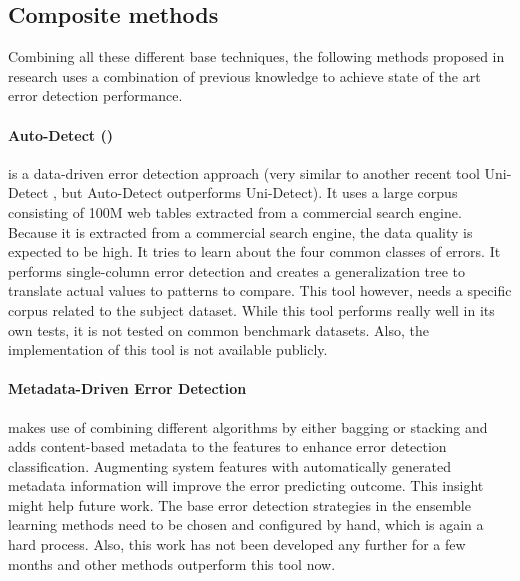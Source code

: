 
\subsection{Composite methods}
Combining all these different base techniques, the following methods proposed in research uses a combination of previous knowledge to achieve state of the art error detection performance. 

\paragraph{Auto-Detect (\cite{Wang2019-jg})} is a data-driven error detection approach (very similar to another recent tool Uni-Detect \cite{Huang2018-er}, but Auto-Detect outperforms Uni-Detect). It uses a large corpus consisting of 100M web tables extracted from a commercial search engine. Because it is extracted from a commercial search engine, the data quality is expected to be high. It tries to learn about the four common classes of errors. It performs single-column error detection and creates a generalization tree to translate actual values to patterns to compare. This tool however, needs a specific corpus related to the subject dataset. While this tool performs really well in its own tests, it is not tested on common benchmark datasets. Also, the implementation of this tool is not available publicly.

\paragraph{Metadata-Driven Error Detection \cite{Visengeriyeva2018-qz}} makes use of combining different algorithms by either bagging or stacking and adds content-based metadata to the features to enhance error detection classification. Augmenting system features with automatically generated metadata information will improve the error predicting outcome. This insight might help future work. The base error detection strategies in the ensemble learning methods need to be chosen and configured by hand, which is again a hard process. Also, this work has not been developed any further for a few months and other methods outperform this tool now.


